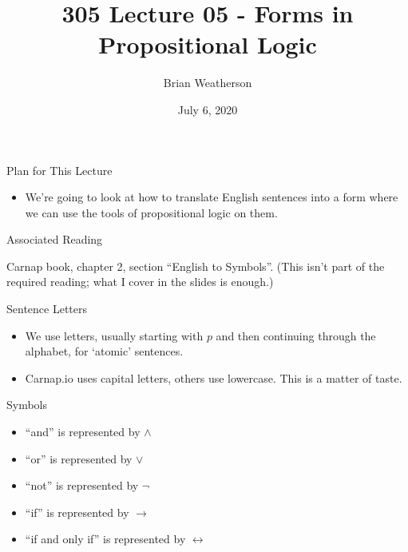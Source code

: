 \documentclass[
  ignorenonframetext,
]{beamer}
\title{305 Lecture 05 - Forms in Propositional Logic}
\author{Brian Weatherson}
\date{July 6, 2020}
\providecommand{\tightlist}{%
  \setlength{\itemsep}{0pt}\setlength{\parskip}{0pt}}
\renewcommand{\,}{\text{, }}
\begin{document}
\frame{\titlepage}

\begin{frame}{Plan for This Lecture}
\protect\hypertarget{plan-for-this-lecture}{}

\begin{itemize}
\tightlist
\item
  We're going to look at how to translate English sentences into a form
  where we can use the tools of propositional logic on them.
\end{itemize}

\end{frame}

\begin{frame}{Associated Reading}
\protect\hypertarget{associated-reading}{}

Carnap book, chapter 2, section ``English to Symbols''. (This isn't part
of the required reading; what I cover in the slides is enough.)

\end{frame}

\begin{frame}{Sentence Letters}
\protect\hypertarget{sentence-letters}{}

\begin{itemize}
\tightlist
\item
  We use letters, usually starting with \(p\) and then continuing
  through the alphabet, for `atomic' sentences.
\item
  Carnap.io uses capital letters, others use lowercase. This is a matter
  of taste.
\end{itemize}

\end{frame}

\begin{frame}{Symbols}
\protect\hypertarget{symbols}{}

\begin{itemize}
\tightlist
\item
  ``and'' is represented by \(\wedge\)
\item
  ``or'' is represented by \(\vee\)
\item
  ``not'' is represented by \(\neg\)
\item
  ``if'' is represented by \(\rightarrow\)
\item
  ``if and only if'' is represented by \(\leftrightarrow\)
\end{itemize}

\end{frame}
\end{document}
